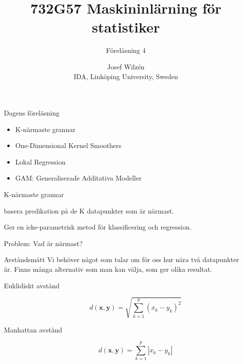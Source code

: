 \documentclass[10pt,english]{beamer}
\title{732G57 Maskininlärning för statistiker}
\subtitle{Föreläsning 4}
\date{}
\author{Josef Wilzén \\ IDA, Linköping University, Sweden}
\begin{document}
\maketitle

\begin{frame}{Dagens föreläsning}

    \begin{itemize}
        \item K-närmaste grannar
        \item One-Dimensional Kernel Smoothers
        \item Lokal Regression
        \item GAM: Generaliserade Additativa Modeller
    \end{itemize}
    
\end{frame}

\begin{frame}{K-närmaste grannar}
    \begin{greenbox}
         basera predikation på de K datapunkter som är närmast.
   \end{greenbox}

   Ger en icke-parametrisk metod för klassificering och regression.

   Problem: Vad är närmast?
\end{frame}

\begin{frame}{Avståndsmått}
    Vi behöver något som talar om för oss hur nära två datapunkter är. Finns många alternativ som man kan välja, som ger olika resultat.

    \begin{description}
        \item[Euklidiskt avstånd]
        \begin{equation*}
            d(\mathbf{x},\mathbf{y}) = \sqrt{\sum_{k=1}^{p} (x_k - y_k)^2}
        \end{equation*}
        \item[Manhattan avstånd] 
        \begin{equation*}
            d(\mathbf{x},\mathbf{y}) = \sum_{k=1}^{p} | x_k - y_k |
        \end{equation*}
    \end{description}
\end{frame}
\end{document}
